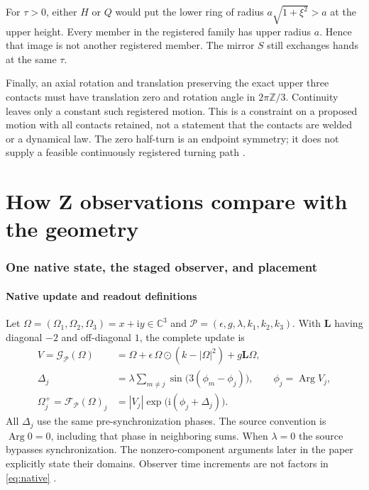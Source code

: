 \documentclass[11pt,a4paper]{article}
\numberwithin{equation}{section}
\newcommand{\C}{\mathbb C}
\newcommand{\ii}{\mathrm i}
\newcommand{\Arg}{\operatorname{Arg}}
\newcommand{\Lmat}{\mathbf L}
\newcommand{\Fmap}{\mathcal F}
\newcommand{\Gmap}{\mathcal G}
\newcommand{\Params}{\mathcal P}
\begin{document}
For $\tau>0$, either $H$ or $Q$ would put the lower ring of radius
$a\sqrt{1+\xi^2}>a$ at the upper height. Every member in the registered
family has upper radius $a$. Hence that image is not another registered
member. The mirror $S$ still exchanges hands at the same $\tau$.

Finally, an axial rotation and translation preserving the exact upper three
contacts must have translation zero and rotation angle in $2\pi\mathbb Z/3$.
Continuity leaves only a constant such registered motion. This is a constraint
on a proposed motion with all contacts retained, not a statement that the
contacts are welded or a dynamical law. The zero half-turn is an endpoint
symmetry; it does not supply a feasible continuously registered turning path
\cite[R9, Sections 2--3]{R9}.

\clearpage
\part{How Z observations compare with the geometry}

\section{One native state, the staged observer, and placement}\label{sec:observer}
\subsection{Native update and readout definitions}
Let $\Omega=(\Omega_1,\Omega_2,\Omega_3)=x+\ii y\in\C^3$ and
$\Params=(\epsilon,g,\lambda,k_1,k_2,k_3)$. With $\Lmat$ having diagonal
$-2$ and off-diagonal $1$, the complete update is
\begin{equation}\label{eq:native}
\begin{aligned}
V=\Gmap_{\Params}(\Omega)
&=\Omega+\epsilon\,\Omega\odot(k-|\Omega|^2)+g\Lmat\Omega,\\
\Delta_j&=\lambda\sum_{m\ne j}\sin\bigl(3(\phi_m-\phi_j)\bigr),
\qquad \phi_j=\Arg V_j,\\
\Omega_j^+=\Fmap_{\Params}(\Omega)_j
&=|V_j|\exp\bigl(\ii(\phi_j+\Delta_j)\bigr).
\end{aligned}
\end{equation}
All $\Delta_j$ use the same pre-synchronization phases. The source convention
is $\Arg0=0$, including that phase in neighboring sums. When $\lambda=0$
the source bypasses synchronization. The nonzero-component arguments later
in the paper explicitly state their domains. Observer time increments are
not factors in \eqref{eq:native} \cite{PaperA,Native}.
\end{document}
